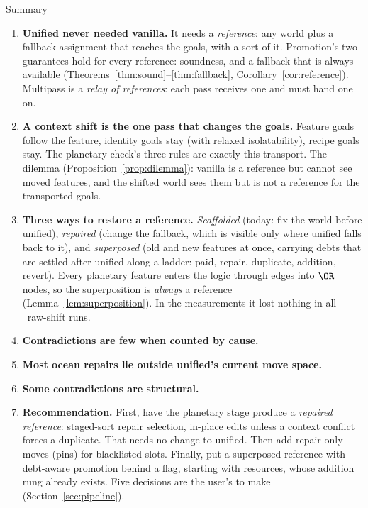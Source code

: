 \begin{keybox}{Summary}
\small
\begin{enumerate}[leftmargin=1.4em, itemsep=2pt]
\item \textbf{Unified never needed vanilla.} It needs a \emph{reference}: any world plus a fallback assignment that reaches the goals, with a sort of it. Promotion's two guarantees hold for every reference: soundness, and a fallback that is always available (Theorems~\ref{thm:sound}--\ref{thm:fallback}, Corollary~\ref{cor:reference}). Multipass is a \emph{relay of references}: each pass receives one and must hand one on.
\item \textbf{A context shift is the one pass that changes the goals.} Feature goals follow the feature, identity goals stay (with relaxed isolatability), recipe goals stay. The planetary check's three rules are exactly this transport. The dilemma (Proposition~\ref{prop:dilemma}): vanilla is a reference but cannot see moved features, and the shifted world sees them but is not a reference for the transported goals.
\item \textbf{Three ways to restore a reference.} \emph{Scaffolded} (today: fix the world before unified), \emph{repaired} (change the fallback, which is visible only where unified falls back to it), and \emph{superposed} (old and new features at once, carrying debts that are settled after unified along a ladder: paid, repair, duplicate, addition, revert). Every planetary feature enters the logic through edges into $\OR$ nodes, so the superposition is \emph{always} a reference (Lemma~\ref{lem:superposition}). In the measurements it lost nothing in all \NumRuns\ raw-shift runs.
\item \textbf{Contradictions are few when counted by cause.} \ResultSummaryCounts
\item \textbf{Most ocean repairs lie outside unified's current move space.} \ResultSummaryWhere
\item \textbf{Some contradictions are structural.} \ResultSummaryStructural
\item \textbf{Recommendation.} First, have the planetary stage produce a \emph{repaired reference}: staged-sort repair selection, in-place edits unless a context conflict forces a duplicate. That needs no change to unified. Then add repair-only moves (pins) for blacklisted slots. Finally, put a superposed reference with debt-aware promotion behind a flag, starting with resources, whose addition rung already exists. Five decisions are the user's to make (Section~\ref{sec:pipeline}).
\end{enumerate}
\end{keybox}
